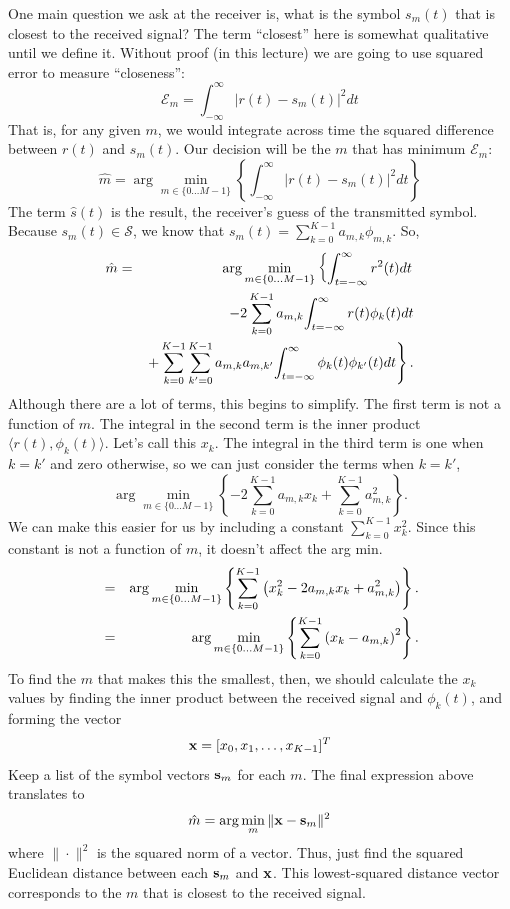 One main question we ask at the receiver is, what is the symbol $s_m(t)$ that is closest to the received signal?  The term ``closest'' here is somewhat qualitative until we define it.  Without proof (in this lecture) we are going to use squared error to measure ``closeness'':
\begin{equation}
 \mathcal{E}_m = \int_{-\infty}^\infty |r(t) - s_m(t)|^2 dt
\end{equation}
That is, for any given $m$, we would integrate across time the squared difference between $r(t)$ and $s_m(t)$.  Our decision will be the $m$ that has minimum $\mathcal{E}_m$:
\begin{equation}
 \hat{m} = \arg \min_{m \in \{0 \ldots M-1\}}  
     \left\{ 
         \int_{-\infty}^\infty |r(t) - s_m(t)|^2 dt
     \right\}
\end{equation}
The term $\hat{s}(t)$ is the result, the receiver's guess of the transmitted symbol.  Because $s_m(t) \in \mathcal{S}$, we know that $s_m(t) = \sum_{k=0}^{K-1} a_{m,k} \phi_{m,k}$.  So,
\begin{eqnarray}
\hat{m} &=& \arg \min_{m \in \{0 \ldots M-1\}} 
     \left\{ 
         {\int_{t = -\infty}^{\infty}  r^2(t) d{t} } \right. \nonumber \\ 
  &&     - 2 \sum_{k=0}^{K-1} a_{m,k} {\int_{t = -\infty}^{\infty}  r(t)\phi_k(t) d{t} }  \nonumber \\ 
  && \left.
         + \sum_{k=0}^{K-1} \sum_{k'=0}^{K-1} a_{m,k} a_{m,k'} {\int_{t = -\infty}^{\infty}  \phi_k(t)\phi_{k'}(t) d{t} } 
     \right\}.
\end{eqnarray}
Although there are a lot of terms, this begins to simplify.  The first term is not a function of $m$.  The integral in the second term is the inner product $\langle r(t),\phi_k(t)\rangle$.  Let's call this $x_k$.  The integral in the third term is one when $k=k'$ and zero otherwise, so we can just consider the terms when $k=k'$,
\begin{equation}
 \arg \min_{m \in \{0 \ldots M-1\}} 
     \left\{ - 2 \sum_{k=0}^{K-1} a_{m,k} x_k + \sum_{k=0}^{K-1} a^2_{m,k}
     \right\}.
\end{equation}
We can make this easier for us by including a constant $\sum_{k=0}^{K-1} x^2_k$. Since this constant is not a function of $m$, it doesn't affect the arg min.
\begin{eqnarray}
 &=& \arg \min_{m \in \{0 \ldots M-1\}} 
     \left\{ \sum_{k=0}^{K-1} \left( x^2_k - 2  a_{m,k} x_k + a^2_{m,k} \right)
     \right\}. \nonumber \\ 
 &=&  \arg \min_{m \in \{0 \ldots M-1\}} 
     \left\{ \sum_{k=0}^{K-1} \left( x_k -  a_{m,k}\right)^2
     \right\}. \nonumber \\ 
\end{eqnarray}
To find the $m$ that makes this the smallest, then, we should calculate the $x_k$ values by finding the inner product between the received signal and $\phi_k(t)$, and forming the vector
\[
 \mathbf{x} = [ x_0, x_1, \ldots, x_{K-1}]^T
\]
Keep a list of the symbol vectors $\mathbf{s}_m$ for each $m$.  The final expression above translates to 
\begin{equation}
\hat{m} = \arg \min_{m} \| \mathbf{x} - \mathbf{s}_m \|^2
\end{equation}
where $\| \cdot \|^2$ is the squared norm of a vector.  Thus, just find the squared Euclidean distance between each $\mathbf{s}_m$ and $\mathbf{x}$.  This lowest-squared distance vector corresponds to the $m$ that is closest to the received signal.


